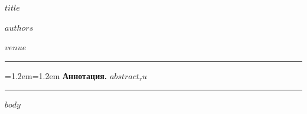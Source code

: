 \documentclass[11pt,a4paper]{article}
\newenvironment{absbox}{\par\begingroup\small\setlength{\parindent}{0pt}\leftskip=1.2em\rightskip=1.2em\ignorespaces}{\par\endgroup}
\begin{document}
\thispagestyle{plain}
\begin{center}
{\LARGE\bfseries\color{ink} $title$\par}
\vspace{1.1em}
{\large $authors$\par}
\vspace{0.5em}
{\small\itshape $venue$\par}
\end{center}
\vspace{0.8em}
{\color{rule}\hrule}
\vspace{0.9em}
\begin{absbox}
\textbf{Аннотация.} $abstract_ru$
\end{absbox}
\vspace{0.7em}
{\color{rule}\hrule}
\vspace{0.4em}
$body$
\end{document}
